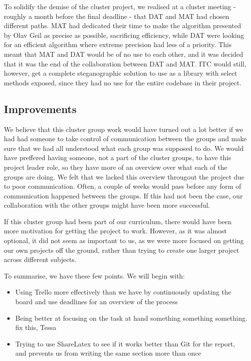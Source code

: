 To solidify the demise of the cluster project, we realised at a cluster meeting - roughly a month before the final deadline - that DAT and MAT had chosen different paths.
MAT had dedicated their time to make the algorithm presented by Olav Geil as precise as possible, sacrificing efficiency, while DAT were looking for an efficient algorithm where extreme precision had less of a priority.
This meant that MAT and DAT would be of no use to each other, and it was decided that it was the end of the collaboration between DAT and MAT.
ITC would still, however, get a complete steganographic solution to use as a library with select methods exposed, since they had no use for the entire codebase in their project.

\subsection*{Improvements}
We believe that this cluster group work would have turned out a lot better if we had had someone to take control of communication between the groups and make sure that we had all understood what each group was supposed to do. 
We would have preffered having someone, not a part of the cluster groups, to have this project leader role, so they have more of an overview over what each of the groups are doing.
We felt that we lacked this overview througout the project due to poor communication.
Often, a couple of weeks would pass before any form of communication happened between the groups. 
If this had not been the case, our collaboration with the other groups might have been more successful. 

If this cluster group had been part of our curriculum, there would have been more motivation for getting the project to work.
However, as it was almost optional, it did not seem as important to us, as we were more focused on getting our own projects off the ground, rather than trying to create one larger project across different subjects.
\vspace{12pt}

\noindent To summarise, we have these few points.
We will begin with:
\begin{itemize}
\item Using Trello more effectively than we have by continuously updating the board and use deadlines for an overview of the process
\item Being better at focusing on the task at hand something something something. fix this, Tessa
\item Trying to use ShareLatex to see if it works better than Git for the report, and prevents us from writing the same section more than once
\end{itemize}


